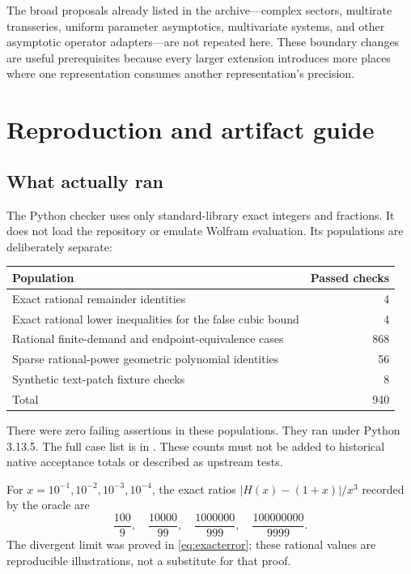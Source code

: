 \documentclass[11pt,letterpaper]{article}
\theoremstyle{definition}\newtheorem{definition}[proposition]{Definition}
\begin{document}
The broad proposals already listed in the archive---complex sectors, multirate
transseries, uniform parameter asymptotics, multivariate systems, and other
asymptotic operator adapters---are not repeated here. These boundary changes
are useful prerequisites because every larger extension introduces more
places where one representation consumes another representation's precision.

\section{Reproduction and artifact guide}
\subsection{What actually ran}
The Python checker uses only standard-library exact integers and fractions.
It does not load the repository or emulate Wolfram evaluation. Its populations
are deliberately separate:
\begin{center}
\begin{tabular}{lr}
\toprule
Population & Passed checks\\
\midrule
Exact rational remainder identities & 4\\
Exact rational lower inequalities for the false cubic bound & 4\\
Rational finite-demand and endpoint-equivalence cases & 868\\
Sparse rational-power geometric polynomial identities & 56\\
Synthetic text-patch fixture checks & 8\\
\midrule
Total & 940\\
\bottomrule
\end{tabular}
\end{center}
There were zero failing assertions in these populations. They ran under
Python 3.13.5. The full case list is in
. These counts must not be added to
historical native acceptance totals or described as upstream tests.

For $x=10^{-1},10^{-2},10^{-3},10^{-4}$, the exact ratios
$|H(x)-(1+x)|/x^3$ recorded by the oracle are
\begin{equation}
 \frac{100}{9},\quad \frac{10000}{99},\quad
 \frac{1000000}{999},\quad \frac{100000000}{9999}.
\end{equation}
The divergent limit was proved in \eqref{eq:exacterror}; these rational values
are reproducible illustrations, not a substitute for that proof.
\end{document}

